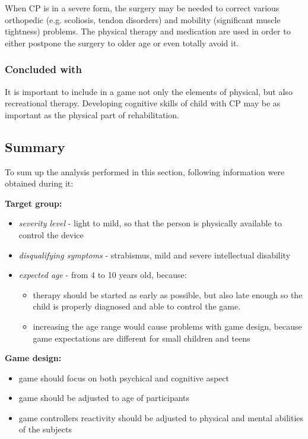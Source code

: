 When CP is in a severe form, the surgery may be needed to correct various orthopedic (e.g. scoliosis, tendon disorders) and mobility (significant muscle tightness) problems. The physical therapy and medication are used in order to either postpone the surgery to older age or even totally avoid it.

\subsubsection*{Concluded with}
It is important to include in a game not only the elements of physical, but also recreational therapy. Developing cognitive skills of child with CP may be as important as the physical part of rehabilitation.

\subsection{Summary}
To sum up the analysis performed in this section, following information were obtained during it:

\textbf{Target group:}
\begin{itemize}
\item \emph{severity level} - light to mild, so that the person is physically available to control the device
\item \emph{disqualifying symptoms} - strabismus, mild and severe intellectual disability
\item \emph{expected age} - from 4 to 10 years old, because:
\begin{itemize}
\item therapy should be started as early as possible, but also late enough so the child is properly diagnosed and able to control the game. 
\item increasing the age range would cause problems with game design, because game expectations are different for small children and teens
\end{itemize}
\end{itemize}

\textbf{Game design:}
\begin{itemize}
\item game should focus on both psychical and cognitive aspect
\item game should be adjusted to age of participants
\item game controllers reactivity should be adjusted to physical and mental abilities of the subjects
\end{itemize}

